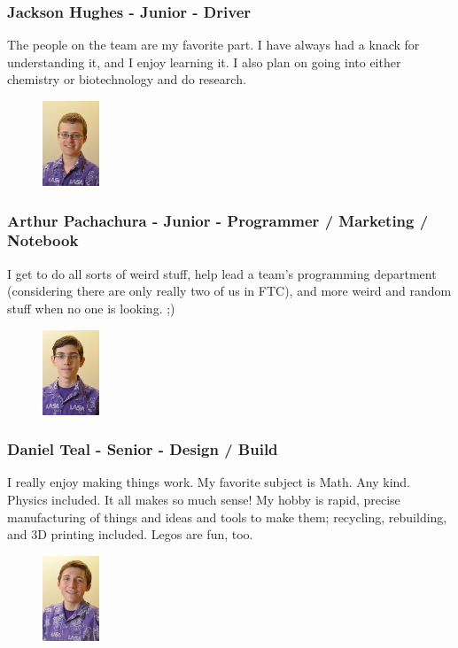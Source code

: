 \subsubsection{Jackson Hughes - Junior - Driver} 
The people on the team are my favorite part.  I have always had a knack for understanding it, and I enjoy learning it. I also plan on going into either chemistry or biotechnology and do research.

\begin{figure}
	\centering
	\includegraphics[height=1in]{arthur}
\end{figure}
\subsubsection{Arthur Pachachura - Junior - Programmer /  Marketing / Notebook} 
I get to do all sorts of weird stuff, help lead a team's programming department (considering there are only really two of us in FTC), and more weird and random stuff when no one is looking. ;)

\begin{figure}
	\centering
	\includegraphics[height=1in]{daniel}
\end{figure}
\subsubsection{Daniel Teal - Senior - Design / Build} 
I really enjoy making things work.  My favorite subject is Math. Any kind. Physics included. It all makes so much sense!  My hobby is rapid, precise manufacturing of things and ideas and tools to make them; recycling, rebuilding, and 3D printing included. Legos are fun, too.

\begin{figure}
	\centering
	\includegraphics[height=1in]{marek}
\end{figure}
